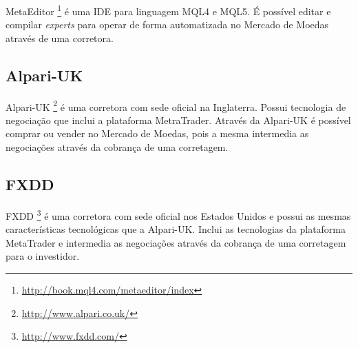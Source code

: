 MetaEditor \footnote{\url{http://book.mql4.com/metaeditor/index}} é uma IDE para linguagem MQL4 e MQL5. É possível editar e compilar \textit{experts} para operar de forma automatizada no Mercado de Moedas através de uma corretora.

\subsection{Alpari-UK}

Alpari-UK \footnote{\url{http://www.alpari.co.uk/}} é uma corretora com sede oficial na Inglaterra. Possui tecnologia de negociação que inclui a plataforma MetraTrader. Através da Alpari-UK é possível comprar ou vender no Mercado de Moedas, pois a mesma intermedia as negociações através da cobrança de uma corretagem.

\subsection{FXDD}

FXDD \footnote{\url{http://www.fxdd.com/}} é uma corretora com sede oficial nos Estados Unidos e possui as mesmas características tecnológicas que a Alpari-UK. Inclui as tecnologias da plataforma MetaTrader e intermedia as negociações através da cobrança de uma corretagem para o investidor.
